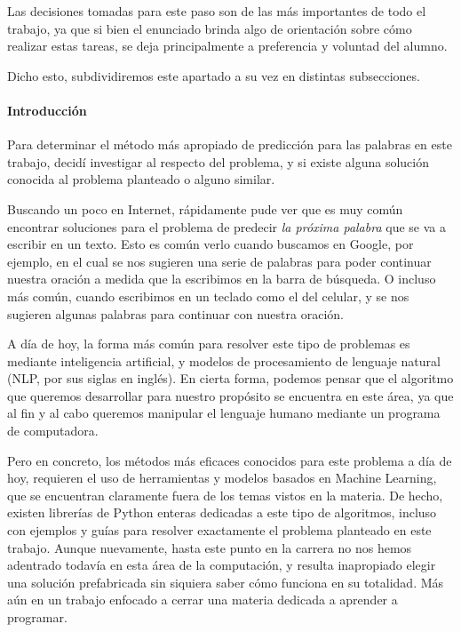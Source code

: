 \documentclass[a4paper]{article}
\begin{document}
Las decisiones tomadas para este paso son de las más importantes de todo el trabajo, ya que si bien el enunciado brinda algo de orientación sobre cómo realizar estas tareas, se deja principalmente a preferencia y voluntad del alumno.

Dicho esto, subdividiremos este apartado a su vez en distintas subsecciones.

\paragraph{Introducción}

Para determinar el método más apropiado de predicción para las palabras en este trabajo, decidí investigar al respecto del problema, y si existe alguna solución conocida al problema planteado o alguno similar.

Buscando un poco en Internet, rápidamente pude ver que es muy común encontrar soluciones para el problema de predecir \textit{la próxima palabra} que se va a escribir en un texto. Esto es común verlo cuando buscamos en Google, por ejemplo, en el cual se nos sugieren una serie de palabras para poder continuar nuestra oración a medida que la escribimos en la barra de búsqueda. O incluso más común, cuando escribimos en un teclado como el del celular, y se nos sugieren algunas palabras para continuar con nuestra oración.

A día de hoy, la forma más común para resolver este tipo de problemas es mediante inteligencia artificial, y modelos de procesamiento de lenguaje natural (NLP, por sus siglas en inglés). En cierta forma, podemos pensar que el algoritmo que queremos desarrollar para nuestro propósito se encuentra en este área, ya que al fin y al cabo queremos manipular el lenguaje humano mediante un programa de computadora\cite{WikiNLP}.

Pero en concreto, los métodos más eficaces conocidos para este problema a día de hoy, requieren el uso de herramientas y modelos basados en Machine Learning, que se encuentran claramente fuera de los temas vistos en la materia. De hecho, existen librerías de Python enteras dedicadas a este tipo de algoritmos, incluso con ejemplos y guías para resolver exactamente el problema planteado en este trabajo\cite{word2vec}. Aunque nuevamente, hasta este punto en la carrera no nos hemos adentrado todavía en esta área de la computación, y resulta inapropiado elegir una solución prefabricada sin siquiera saber cómo funciona en su totalidad. Más aún en un trabajo enfocado a cerrar una materia dedicada a aprender a programar. \\
\end{document}
